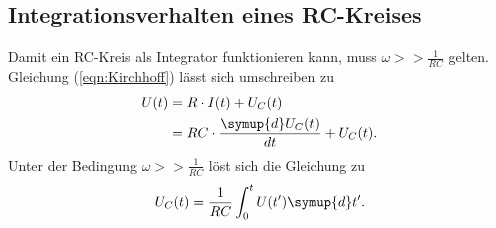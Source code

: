 \subsection{Integrationsverhalten eines RC-Kreises}
\label{sec:IntegrationsverhalteneinesRC-Kreises}

Damit ein RC-Kreis als Integrator funktionieren kann, muss $\omega >> \frac{1}{RC}$ gelten.
Gleichung (\ref{eqn:Kirchhoff}) lässt sich umschreiben zu
\begin{align*}
    U(t)&=R \cdot I(t)+U_{C}(t)\\
        &=RC\cdot \frac{\symup{d}U_{C}(t)}{dt}+U_{C}(t).
\end{align*}
Unter der Bedingung $\omega >>\frac{1}{RC}$ löst sich die Gleichung zu
\begin{align}
    \label{eqn:Kondensatorspannung}
    U_{C}(t)=\frac{1}{RC}\int_{0}^{t} U(t')\symup{d}t'.
\end{align}